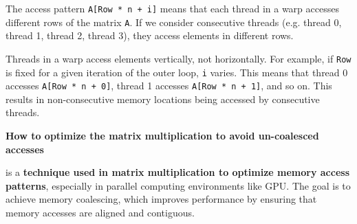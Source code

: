 \begin{itemize}
    The access pattern \texttt{A[Row * n + i]} means that each thread in a warp accesses different rows of the matrix \texttt{A}. If we consider consecutive threads (e.g. thread 0, thread 1, thread 2, thread 3), they access elements in different rows.
    
    Threads in a warp access elements vertically, not horizontally. For example, if \texttt{Row} is fixed for a given iteration of the outer loop, \texttt{i} varies. This means that thread 0 accesses \texttt{A[Row * n + 0]}, thread 1 accesses \texttt{A[Row * n + 1]}, and so on. This results in non-consecutive memory locations being accessed by consecutive threads.
\end{itemize}

\highspace
\begin{flushleft}
    \textcolor{Green3}{ \textbf{How to optimize the matrix multiplication to avoid un-coalesced accesses}}
\end{flushleft}
 is a \textbf{technique used in matrix multiplication to optimize memory access patterns}, especially in parallel computing environments like GPU. The goal is to achieve memory coalescing, which improves performance by ensuring that memory accesses are aligned and contiguous.

